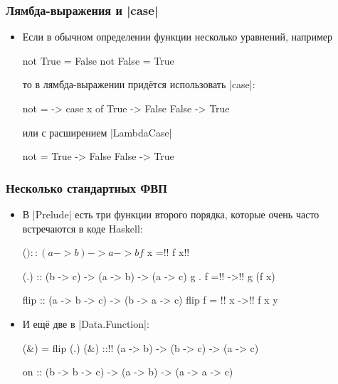 \documentclass[10pt]{beamer}
\begin{document}
\begin{frame}[fragile]
  \frametitle{Лямбда-выражения и \haskinline|case|}
  \begin{itemize}
    \item Если в обычном определении функции несколько уравнений, например
          \begin{haskell}
            not True  = False
            not False = True
          \end{haskell}
          то в лямбда-выражении придётся использовать \haskinline|case|:\pause
          \begin{haskell}
            not = \x -> case x of
                True  -> False
                False -> True
          \end{haskell}
          \pause
          или с расширением \haskinline|LambdaCase|
          \begin{haskell}
            not = \case
                True  -> False
                False -> True
          \end{haskell}
  \end{itemize}
\end{frame}

\begin{frame}[fragile]
  \frametitle{Несколько стандартных ФВП}
  \begin{itemize}
    \item В \haskinline|Prelude| есть три функции второго порядка, которые очень часто встречаются в коде Haskell:
          \begin{haskell}
            ($) :: (a -> b) -> a -> b
            f $ x =!\pause! f x!\pause!

            (.) :: (b -> c) -> (a -> b) -> (a -> c)
            g . f =!\pause! \x ->!\pause! g (f x)

            flip :: (a -> b -> c) -> (b -> a -> c)
            flip f = !\pause! \y x ->!\pause! f x y
          \end{haskell}
    \item И ещё две в \haskinline|Data.Function|:
          \begin{haskell}
            (&) = flip (.)
            (&) ::!\pause! (a -> b) -> (b -> c) -> (a -> c)

            on :: (b -> b -> c) -> (a -> b) -> 
                (a -> a -> c)
          \end{haskell}
  \end{itemize}
\end{frame}
\end{document}
